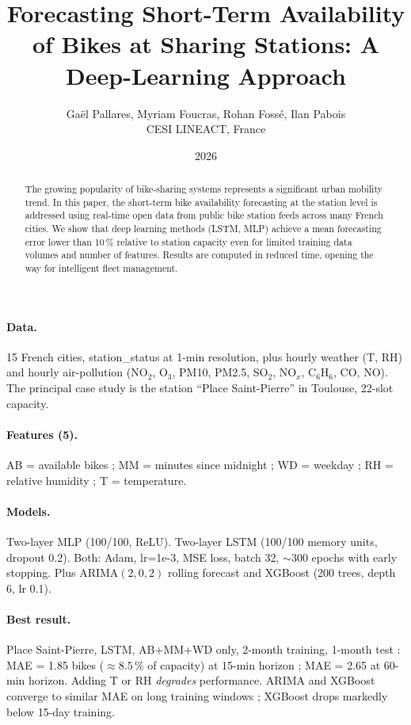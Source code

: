 \documentclass[a4paper,twoside]{article}
\begin{document}
\title{Forecasting Short-Term Availability of Bikes at Sharing Stations:
A Deep-Learning Approach}

\author{Ga\"el Pallares, Myriam Foucras, Rohan Foss\'e, Ilan Pabois\\
CESI LINEACT, France}

\date{2026}
\maketitle

\begin{abstract}
The growing popularity of bike-sharing systems represents a significant
urban mobility trend. In this paper, the short-term bike availability
forecasting at the station level is addressed using real-time open data
from public bike station feeds across many French cities. We show that
deep learning methods (LSTM, MLP) achieve a mean forecasting error
lower than 10\,\% relative to station capacity even for limited training
data volumes and number of features. Results are computed in reduced
time, opening the way for intelligent fleet management.
\end{abstract}

\paragraph{Data.} 15 French cities, station\_status at 1-min resolution,
plus hourly weather (T, RH) and hourly air-pollution (NO$_2$, O$_3$,
PM10, PM2.5, SO$_2$, NO$_x$, C$_6$H$_6$, CO, NO). The principal case
study is the station ``Place Saint-Pierre'' in Toulouse, 22-slot
capacity.

\paragraph{Features (5).}
AB = available bikes ;
MM = minutes since midnight ;
WD = weekday ;
RH = relative humidity ;
T = temperature.

\paragraph{Models.}
Two-layer MLP (100/100, ReLU). Two-layer LSTM (100/100 memory units,
dropout 0.2). Both: Adam, lr=1e-3, MSE loss, batch 32, $\sim 300$
epochs with early stopping. Plus ARIMA$(2,0,2)$ rolling forecast and
XGBoost (200 trees, depth 6, lr 0.1).

\paragraph{Best result.}
Place Saint-Pierre, LSTM, AB+MM+WD only, 2-month training,
1-month test : MAE = 1.85 bikes ($\approx 8.5\,\%$ of capacity) at
15-min horizon ; MAE = 2.65 at 60-min horizon. Adding T or RH
\emph{degrades} performance. ARIMA and XGBoost converge to similar
MAE on long training windows ; XGBoost drops markedly below 15-day
training.
\end{document}
